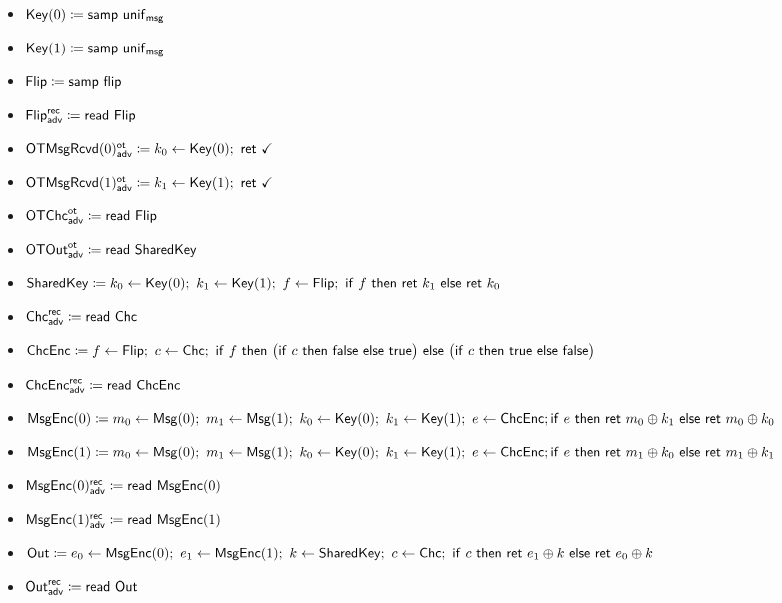\begin{itemize}
\item $\mathsf{Key}(0) \coloneqq \mathsf{samp} \ \mathsf{unif}_{\mathsf{msg}}$
\item $\mathsf{Key}(1) \coloneqq \mathsf{samp} \ \mathsf{unif}_{\mathsf{msg}}$
\item $\mathsf{Flip} \coloneqq \mathsf{samp} \ \mathsf{flip}$
\item {\color{blue} $\mathsf{Flip}^{\mathsf{rec}}_{\mathsf{adv}} \coloneqq \mathsf{read} \ \mathsf{Flip}$}
\item {\color{blue} $\LeakOTMsgRcvd(0)^\ot_\adv \coloneqq k_0 \leftarrow \Key(0); \ \ret{\checkmark}$}
\item {\color{blue} $\LeakOTMsgRcvd(1)^\ot_\adv \coloneqq k_1 \leftarrow \Key(1); \ \ret{\checkmark}$}
\item {\color{blue} $\mathsf{OTChc}^{\mathsf{ot}}_{\mathsf{adv}} \coloneqq \mathsf{read} \ \mathsf{Flip}$}
\item {\color{blue} $\mathsf{OTOut}^{\mathsf{ot}}_{\mathsf{adv}} \coloneqq \mathsf{read} \ \mathsf{SharedKey}$}
\item $\SharedKey \coloneqq k_0 \leftarrow \Key(0); \ k_1 \leftarrow \Key(1); \ f \leftarrow \Flip; \ \ifte{f}{\ret{k_1}}{\ret{k_0}}$
\item {\color{blue} $\mathsf{Chc}^{\mathsf{rec}}_{\mathsf{adv}} \coloneqq \mathsf{read} \ \mathsf{Chc}$}
\item $\ChcEnc \coloneqq f \leftarrow \Flip; \ c \leftarrow \Chc; \ \ifte{f}{\big(\ifte{c}{\false}{\true}\big)}{\big(\ifte{c}{\true}{\false}\big)}$
\item {\color{blue} $\mathsf{ChcEnc}^{\mathsf{rec}}_{\mathsf{adv}} \coloneqq \mathsf{read} \ \mathsf{ChcEnc}$}
\item $\mathsf{MsgEnc}(0) \coloneqq m_0 \leftarrow \mathsf{Msg}(0); \ m_1 \leftarrow \mathsf{Msg}(1); \ k_0 \leftarrow \mathsf{Key}(0); \ k_1 \leftarrow \mathsf{Key}(1); \ e \leftarrow \mathsf{ChcEnc}; \\ \mathsf{if} \ e \ \mathsf{then} \ \mathsf{ret} \ m_0 \oplus k_1 \ \mathsf{else} \ \mathsf{ret} \ m_0 \oplus k_0$
\item $\mathsf{MsgEnc}(1) \coloneqq m_0 \leftarrow \mathsf{Msg}(0); \ m_1 \leftarrow \mathsf{Msg}(1); \ k_0 \leftarrow \mathsf{Key}(0); \ k_1 \leftarrow \mathsf{Key}(1); \ e \leftarrow \mathsf{ChcEnc}; \\ \mathsf{if} \ e \ \mathsf{then} \ \mathsf{ret} \ m_1 \oplus k_0 \ \mathsf{else} \ \mathsf{ret} \ m_1 \oplus k_1$
\item {\color{blue} $\mathsf{MsgEnc}(0)^{\mathsf{rec}}_{\mathsf{adv}} \coloneqq \mathsf{read} \ \mathsf{MsgEnc}(0)$}
\item {\color{blue} $\mathsf{MsgEnc}(1)^{\mathsf{rec}}_{\mathsf{adv}} \coloneqq \mathsf{read} \ \mathsf{MsgEnc}(1)$}
\item $\mathsf{Out} \coloneqq e_0 \leftarrow \mathsf{MsgEnc}(0); \ e_1 \leftarrow \mathsf{MsgEnc}(1); \ k \leftarrow \mathsf{SharedKey}; \ c \leftarrow \mathsf{Chc}; \ \mathsf{if} \ c \ \mathsf{then} \ \mathsf{ret} \ e_1 \oplus k \ \mathsf{else} \ \mathsf{ret} \ e_0 \oplus k$
\item {\color{blue} $\mathsf{Out}^{\mathsf{rec}}_{\mathsf{adv}} \coloneqq \mathsf{read} \ \mathsf{Out}$}
\end{itemize}

